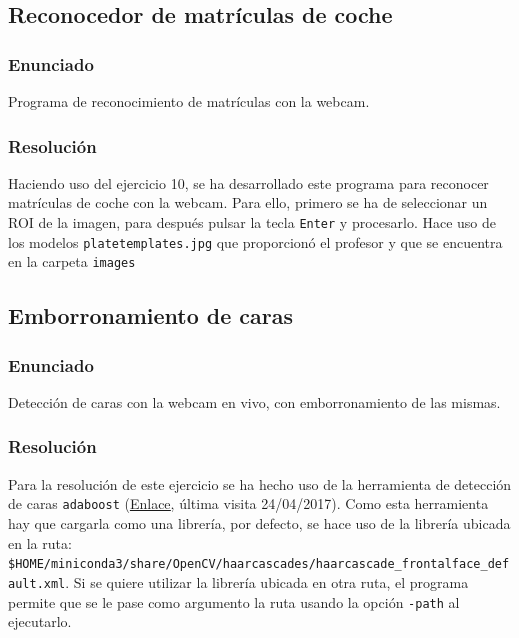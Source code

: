 \documentclass[a4paper,10pt,titlepage,oneside,openright]{book}
\begin{document}
\medskip
\subsection{Reconocedor de matrículas de coche}

\subsubsection*{Enunciado}
Programa de reconocimiento de matrículas con la webcam.

\subsubsection*{Resolución}
Haciendo uso del ejercicio 10, se ha desarrollado este programa para reconocer matrículas de coche con la webcam. Para ello, primero se ha de seleccionar un ROI de la imagen, para después pulsar la tecla \texttt{Enter} y procesarlo. Hace uso de los modelos \texttt{platetemplates.jpg} que proporcionó el profesor y que se encuentra en la carpeta \texttt{images}



\medskip
\subsection{Emborronamiento de caras}

\subsubsection*{Enunciado}
Detección de caras con la webcam en vivo, con emborronamiento de las mismas.

\subsubsection*{Resolución}
Para la resolución de este ejercicio se ha hecho uso de la herramienta de detección de caras \texttt{adaboost} (\href{https://en.wikipedia.org/wiki/Viola\%E2\%80\%93Jones\_object\_detection\_framework}{\color{blue}\underline{Enlace}}, última visita 24/04/2017). Como esta herramienta hay que cargarla como una librería, por defecto, se hace uso de la librería ubicada en la ruta: \texttt{\$HOME/miniconda3/share/OpenCV/haarcascades/haarcascade\_frontalface\_default.xml}. Si se quiere utilizar la librería ubicada en otra ruta, el programa permite que se le pase como argumento la ruta usando la opción \texttt{-path} al ejecutarlo. \\
\end{document}
